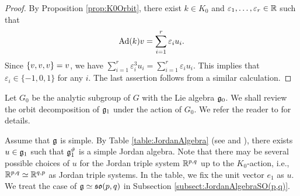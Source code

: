\begin{proof}
	By Proposition \ref{prop:K0Orbit}, there exist $k \in K_0$ and $\varepsilon_1, \ldots, \varepsilon_r \in \mathbb{R}$ such that
	\begin{align*}
		\mathrm{Ad}(k)v = \sum_{i=1}^r \varepsilon_i u_i.
	\end{align*}
	Since $\{v, v, v\} = v$, we have $\sum_{i=1}^r \varepsilon_i^3 u_i = \sum_{i=1}^r \varepsilon_i u_i$.
	This implies that $\varepsilon_i \in \{-1, 0, 1\}$ for any $i$.
	The last assertion follows from a similar calculation.
\end{proof}

Let $G_0$ be the analytic subgroup of $G$ with the Lie algebra $\mathfrak{g}_0$.
We shall review the orbit decomposition of $\mathfrak{g}_1$ under the action of $G_0$.
We refer the reader to \cite{Ka98} for details.

Assume that $\mathfrak{g}$ is simple.
By Table \ref{table:JordanAlgebra} (see \cite[Table II]{Ka98} and \cite[Table 4]{HiKoMo14}), there exists $u \in \mathfrak{g}_1$ such that $\mathfrak{g}_1^\vartheta$ is a simple Jordan algebra.
Note that there may be several possible choices of $u$ for the Jordan triple system $\mathbb{R}^{p,q}$ up to the $K_0$-action, i.e., $\mathbb{R}^{p,q} \simeq \mathbb{R}^{q,p}$ as Jordan triple systems.
In the table, we fix the unit vector $e_1$ as $u$.
We treat the case of $\mathfrak{g} \simeq \mathfrak{so}(p, q)$ in Subsection \ref{subsect:JordanAlgebraSO(p,q)}.

